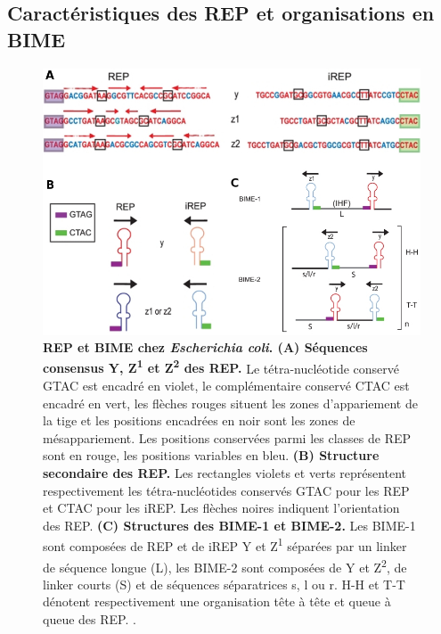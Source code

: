 \documentclass[12pt,a4paper]{report}
\begin{document}
\begin{onehalfspace}
\section*{Caractéristiques des REP et organisations en BIME}

\begin{figure}[ht]
\centerline{\includegraphics[scale=0.5]{figures/rep_bime.jpg}}
\caption{\textbf{REP et BIME chez \textit{Escherichia coli}. (A) Séquences consensus Y, Z\textsuperscript{1} et Z\textsuperscript{2} des REP.} Le tétra-nucléotide conservé GTAC est encadré en violet, le complémentaire conservé CTAC est encadré en vert, les flèches rouges situent les zones d'appariement de la tige et les positions encadrées en noir sont les zones de mésappariement. Les positions conservées parmi les classes de REP sont en rouge, les positions variables en bleu. \textbf{(B) Structure secondaire des REP.} Les rectangles violets et verts représentent respectivement les tétra-nucléotides conservés GTAC pour les REP et CTAC pour les iREP. Les flèches noires indiquent l'orientation des REP. \textbf{(C) Structures des BIME-1 et BIME-2.} Les BIME-1 sont composées de REP et de iREP Y et Z\textsuperscript{1} séparées par un linker de séquence longue (L), les BIME-2 sont composées de Y et Z\textsuperscript{2}, de linker courts (S) et de séquences séparatrices s, l ou r. H-H et T-T dénotent respectivement une organisation tête à tête et queue à queue des REP. \citep{Ton-Hoang2012}.}
\label{fig:rep_bime} 
\end{figure}


\end{onehalfspace}
\end{document}
